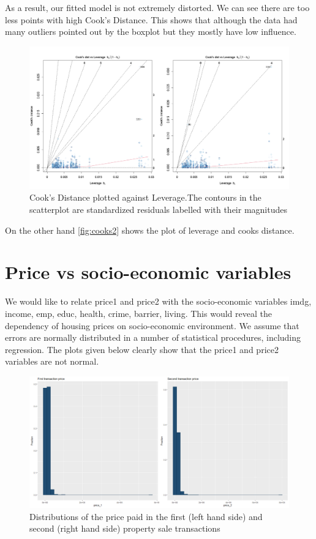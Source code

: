 \documentclass[12pt]{article}
\begin{document}
As a result, our fitted model is not extremely distorted. We can see there are too less points with high Cook’s Distance. This shows that although the data had many outliers pointed out by the boxplot but they mostly have low influence.
\begin{figure}[H]
    \centering
    \includegraphics[width=18cm]{3.3 images/3.3.4.1.png}
    \caption{Cook's Distance plotted against Leverage.The contours in the scatterplot are standardized residuals labelled with their magnitudes}
    \label{fig:cooks2}
\end{figure}
On the other hand \autoref{fig:cooks2} shows the plot of leverage and cooks distance.

\section{Price vs socio-economic variables}
We would like to relate \gls{price1} and \gls{price2} with the socio-economic variables \gls{imdg}, \gls{income}, \gls{emp}, \gls{educ}, \gls{health}, \gls{crime}, \gls{barrier}, \gls{living}. This would reveal the dependency of housing prices on socio-economic environment.
We assume that errors are normally distributed in a number of statistical procedures, including regression. The plots given below clearly show that the \gls{price1} and \gls{price2} variables are not normal.

\begin{figure}[H]
    \centering
    \includegraphics[width=18cm]{4. price vs socio-eco images/4non-normalplots.png}
    \caption{Distributions of the price paid in the first (left hand side) and second (right hand side) property sale transactions}
    \label{fig:prices}
\end{figure}
\end{document}
